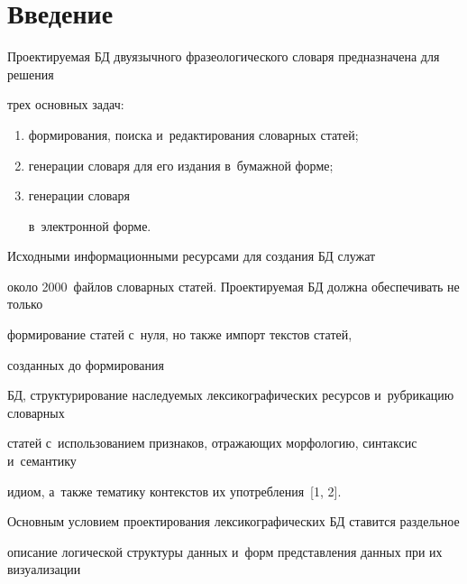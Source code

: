   







 \thispagestyle{headings}

 

 \vspace*{-12pt} 



\section{Введение}



  Проектируемая БД двуязычного фразеологического словаря предназначена для решения 

трех основных задач:

\begin{enumerate}[(1)]

\item формирования, поиска и~редактирования словарных статей; 

\item генерации словаря для его издания в~бумажной форме;

\item генерации словаря 

в~электронной форме.

\end{enumerate}

 Исходными информационными ресурсами для создания БД служат 

около 2000~файлов словарных статей. Проектируемая БД должна обеспечивать не только 

формирование статей с~нуля, но также импорт текстов статей, 

созданных до формирования 

БД, структурирование наследуемых лексикографических ресурсов и~рубрикацию словарных 

статей с~использованием признаков, отражающих морфологию, синтаксис и~семантику 

идиом, а~также тематику контекстов их употребления~[1, 2].

  

  Основным условием проектирования лексикографических БД ставится раздельное 

описание логической структуры данных и~форм представления данных при их визуализации 

